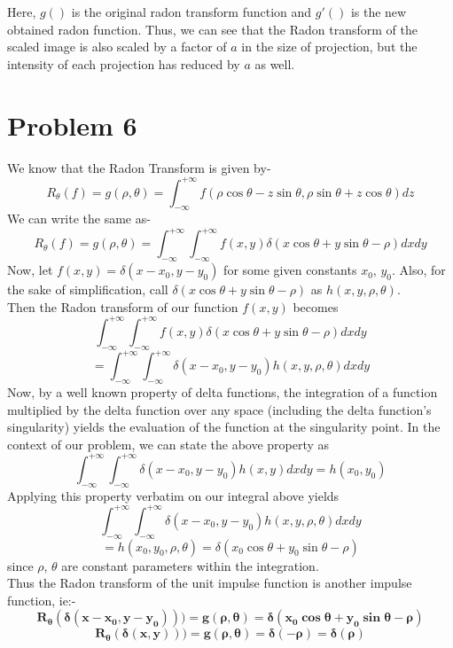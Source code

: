 \documentclass[a4paper,11pt]{article}
\numberwithin{definition}{section}
\numberwithin{mytheorem}{subsection}
\begin{document}
Here, $g()$ is the original radon transform function and $g'()$ is the new obtained radon function. Thus, we can see that the Radon transform of the scaled image is also scaled by a factor of $a$ in the size of projection, but the intensity of each projection has reduced by $a$ as well.
 








\section{Problem 6}

We know that the Radon Transform is given by-
$$R_\theta(f) =g(\rho, \theta)= \int_{-\infty}^{+\infty}f(\rho \cos\theta - z\sin\theta,\rho \sin \theta + z \cos\theta)dz $$
We can write the same as-
$$R_\theta(f) =g(\rho, \theta)= \int_{-\infty}^{+\infty}\int_{-\infty}^{+\infty}f(x,y)\delta(x\cos\theta+y\sin\theta -\rho)dxdy $$
Now, let $f(x, y) = \delta(x-x_0, y-y_0)$ for some given constants $x_0$, $y_0$. Also, for the sake of simplification, call $\delta(x\cos\theta+y\sin\theta -\rho)$ as $h(x, y, \rho, \theta)$.\\
Then the Radon transform of our function $f(x,y)$ becomes
$$\int_{-\infty}^{+\infty}\int_{-\infty}^{+\infty}f(x,y)\delta(x\cos\theta+y\sin\theta -\rho)dxdy$$
$$ = \int_{-\infty}^{+\infty}\int_{-\infty}^{+\infty}\delta(x-x_0, y-y_0)h(x,y,\rho,\theta)dxdy$$
Now, by a well known property of delta functions, the integration of a function multiplied by the delta function over any space (including the delta function's singularity) yields the evaluation of the function at the singularity point. In the context of our problem, we can state the above property as 
$$\int_{-\infty}^{+\infty}\int_{-\infty}^{+\infty}\delta(x-x_0, y-y_0)h(x,y)dxdy = h(x_0, y_0)$$
Applying this property verbatim on our integral above yields
$$\int_{-\infty}^{+\infty}\int_{-\infty}^{+\infty}\delta(x-x_0, y-y_0)h(x,y,\rho,\theta)dxdy$$
$$ = h(x_0, y_0, \rho, \theta) = \delta(x_0\cos\theta+y_0\sin\theta -\rho)$$
since $\rho$, $\theta$ are constant parameters within the integration.\\
Thus the Radon transform of the unit impulse function is another impulse function, ie:-
$$\boldsymbol{R_{\theta}(\delta(x-x_0, y-y_0))) = g(\rho, \theta) = \delta(x_0\cos\theta+y_0\sin\theta -\rho)}$$
$$\boldsymbol{R_{\theta}(\delta(x, y))) = g(\rho, \theta) = \delta(-\rho) = \delta(\rho)}$$
\end{document}
